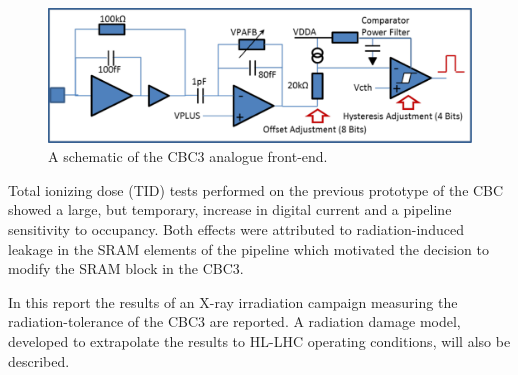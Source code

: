 
\begin{figure}[!htbp]
\centering
\includegraphics[width=0.9\linewidth]{Figures/Architecture_AnalogueFE}
\vspace*{-2mm}
\caption[Fit.]{A schematic of the CBC3 analogue front-end.}
\label{fig:Architecture_AnalogueFE}
\end{figure} 
 
Total ionizing dose (TID) tests performed on the previous prototype \cite{CBC2nim} of the CBC showed a large, but temporary, increase in digital current and a pipeline sensitivity to occupancy. Both effects were attributed to radiation-induced leakage in the SRAM elements of the pipeline which motivated the decision to modify the SRAM block in the CBC3. 

In this report the results of an X-ray irradiation campaign measuring the radiation-tolerance of the CBC3 are reported. A radiation damage model, developed to extrapolate the results to HL-LHC operating conditions, will also be described.